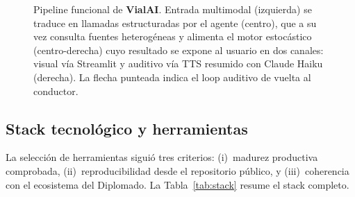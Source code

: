 \documentclass[11pt,a4paper]{article}
\newcommand{\VialAI}{\textbf{\textcolor{vialTeal}{Vial}\textcolor{vialAmber}{AI}}}
\begin{document}
\begin{figure}[H]
\caption{Pipeline funcional de \VialAI. Entrada multimodal
(izquierda) se traduce en llamadas estructuradas por el agente
(centro), que a su vez consulta fuentes heterogéneas y alimenta
el motor estocástico (centro-derecha) cuyo resultado se expone al
usuario en dos canales: visual vía Streamlit y auditivo vía TTS
resumido con Claude Haiku (derecha). La flecha punteada indica el
loop auditivo de vuelta al conductor.}
\label{fig:pipeline}
\end{figure}

\subsection{Stack tecnológico y herramientas}
\label{sec:stack}

La selección de herramientas siguió tres criterios: (i)~madurez
productiva comprobada, (ii)~reproducibilidad desde el repositorio
público, y (iii)~coherencia con el ecosistema del Diplomado.
La Tabla~\ref{tab:stack} resume el stack completo.
\end{document}
